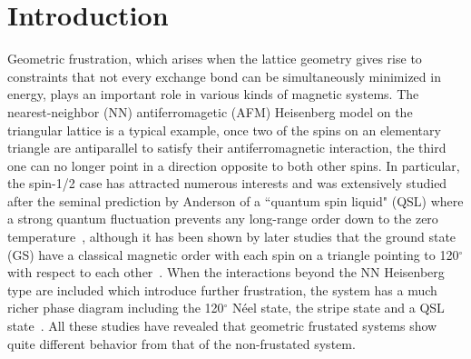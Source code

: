 \documentclass[aps,prb,reprint,amsfonts,amsmath,amssymb,showpacs,groupedaddress,superscriptaddress]{revtex4-1}
\begin{document}
\maketitle

\section{\label{sec:Introduction}Introduction}


Geometric frustration, which arises when the lattice geometry gives rise to constraints that not every exchange bond can be simultaneously minimized in energy, plays an important role in various kinds of magnetic systems. The nearest-neighbor (NN) antiferromagetic (AFM) Heisenberg model on the triangular lattice is a typical example, once two of the spins on an elementary triangle are antiparallel to satisfy their antiferromagnetic interaction, the third one can no longer point in a direction opposite to both other spins. In particular, the spin-1/2 case has attracted numerous interests and was extensively studied after the seminal prediction by Anderson of a ``quantum spin liquid" (QSL) where a strong quantum fluctuation prevents any long-range order down to the zero temperature~\cite{Anderson1973}, although it has been shown by later studies that the ground state (GS) have a classical magnetic order with each spin on a triangle pointing to 120$^\circ$ with respect to each other~\cite{PhysRevLett.99.127004,PhysRevLett.82.3899,PhysRevB.50.10048,PhysRevLett.60.2531}. When the interactions beyond the NN Heisenberg type are included which introduce further frustration, the system has a much richer phase diagram including the 120$^\circ$ N\'{e}el state, the stripe state and a QSL state~\cite{PhysRevB.91.014426,PhysRevB.92.041105,PhysRevB.92.140403,PhysRevB.96.165141,PhysRevB.93.144411,JPSJ.83.093707,PhysRevB.94.121111,PhysRevB.96.075116,PhysRevLett.120.207203,PhysRevB.95.165110,PhysRevLett.123.207203,PhysRevX.9.031026}. All these studies have revealed that geometric frustated systems show quite different behavior from that of the non-frustated system.
\end{document}

